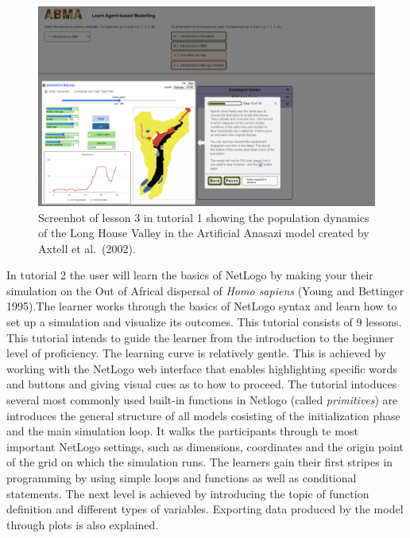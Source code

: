 \documentclass[
]{article}
\begin{document}
\begin{figure}
\centering
\includegraphics{paper_files/Screenshot_ABMA_tutorial_1_lesson_3.png}
\caption{Screenhot of lesson 3 in tutorial 1 showing the population dynamics of the Long House Valley in the Artificial Anasazi model created by Axtell et al.~(2002).}
\end{figure}

In tutorial 2 the user will learn the basics of NetLogo by making your their simulation on the Out of Africal dispersal of \emph{Homo sapiens} (Young and Bettinger 1995).The learner works through the basics of NetLogo syntax and learn how to set up a simulation and visualize its outcomes. This tutorial consists of 9 lessons. This tutorial intends to guide the learner from the introduction to the beginner level of proficiency. The learning curve is relatively gentle. This is achieved by working with the NetLogo web interface that enables highlighting specific words and buttons and giving visual cues as to how to proceed. The tutorial intoduces several most commonly used built-in functions in Netlogo (called \emph{primitives}) are introduces the general structure of all models cosisting of the initialization phase and the main simulation loop. It walks the participants through te most important NetLogo settings, such as dimensions, coordinates and the origin point of the grid on which the simulation runs. The learners gain their first stripes in programming by using simple loops and functions as well as conditional statements. The next level is achieved by introducing the topic of function definition and different types of variables. Exporting data produced by the model through plots is also explained.
\end{document}
